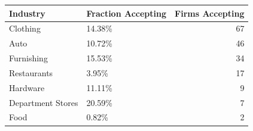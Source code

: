 \begin{tabular}[t]{llr}
\toprule
Industry & Fraction Accepting & Firms Accepting\\
\midrule
Clothing & 14.38\% & 67\\
Auto & 10.72\% & 46\\
Furnishing & 15.53\% & 34\\
Restaurants & 3.95\% & 17\\
Hardware & 11.11\% & 9\\
\addlinespace
Department Stores & 20.59\% & 7\\
Food & 0.82\% & 2\\
\bottomrule
\end{tabular}
